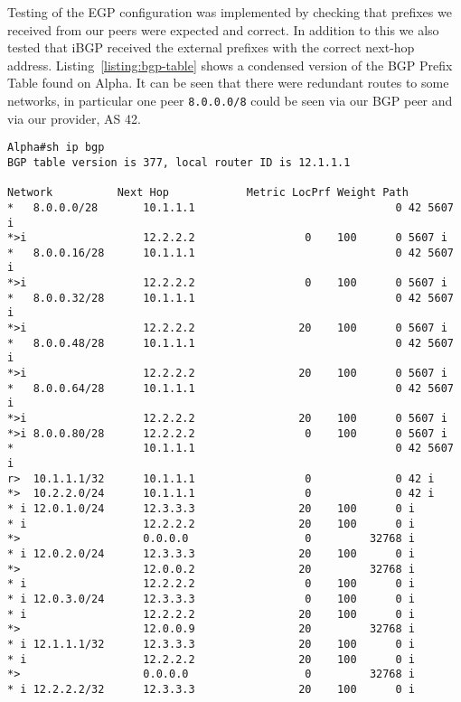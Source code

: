 Testing of the EGP configuration was implemented by checking that prefixes we
received from our peers were expected and correct. In addition to this we also
tested that iBGP received the external prefixes with the correct next-hop
address. Listing~\ref{listing:bgp-table} shows a condensed version of the BGP
Prefix Table found on Alpha. It can be seen that there were redundant routes to
some networks, in particular one peer \texttt{8.0.0.0/8} could be seen via our
BGP peer and via our provider, AS 42.

\begin{lstlisting}[caption={Extract of Alpha BGP Table}, label={listing:bgp-table}]
Alpha#sh ip bgp
BGP table version is 377, local router ID is 12.1.1.1

Network          Next Hop            Metric LocPrf Weight Path
*   8.0.0.0/28       10.1.1.1                               0 42 5607 i
*>i                  12.2.2.2                 0    100      0 5607 i
*   8.0.0.16/28      10.1.1.1                               0 42 5607 i
*>i                  12.2.2.2                 0    100      0 5607 i
*   8.0.0.32/28      10.1.1.1                               0 42 5607 i
*>i                  12.2.2.2                20    100      0 5607 i
*   8.0.0.48/28      10.1.1.1                               0 42 5607 i
*>i                  12.2.2.2                20    100      0 5607 i
*   8.0.0.64/28      10.1.1.1                               0 42 5607 i
*>i                  12.2.2.2                20    100      0 5607 i
*>i 8.0.0.80/28      12.2.2.2                 0    100      0 5607 i
*                    10.1.1.1                               0 42 5607 i
r>  10.1.1.1/32      10.1.1.1                 0             0 42 i
*>  10.2.2.0/24      10.1.1.1                 0             0 42 i
* i 12.0.1.0/24      12.3.3.3                20    100      0 i
* i                  12.2.2.2                20    100      0 i
*>                   0.0.0.0                  0         32768 i
* i 12.0.2.0/24      12.3.3.3                20    100      0 i
*>                   12.0.0.2                20         32768 i
* i                  12.2.2.2                 0    100      0 i
* i 12.0.3.0/24      12.3.3.3                 0    100      0 i
* i                  12.2.2.2                20    100      0 i
*>                   12.0.0.9                20         32768 i
* i 12.1.1.1/32      12.3.3.3                20    100      0 i
* i                  12.2.2.2                20    100      0 i
*>                   0.0.0.0                  0         32768 i
* i 12.2.2.2/32      12.3.3.3                20    100      0 i

\end{lstlisting}
